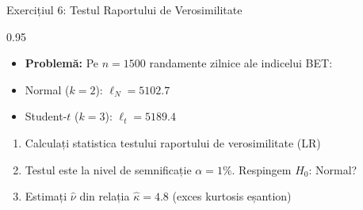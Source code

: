 \documentclass[9pt, aspectratio=169, t]{beamer}
\begin{document}
\begin{frame}{Exercițiul 6: Testul Raportului de Verosimilitate}
\begin{cminipage}{0.95\textwidth}
    \begin{itemize}\setlength{\itemsep}{0pt}
        \item \textbf{Problemă:} Pe $n = 1500$ randamente zilnice ale indicelui BET:
    \end{itemize}
    \begin{itemize}\setlength{\itemsep}{0pt}
        \item Normal ($k=2$): $\ell_N = 5102.7$
        \item Student-$t$ ($k=3$): $\ell_t = 5189.4$
    \end{itemize}
    \begin{enumerate}\setlength{\itemsep}{0pt}
        \item Calculați statistica testului raportului de verosimilitate (LR)
        \item Testul este la nivel de semnificație $\alpha = 1\%$. Respingem $H_0$: Normal?
        \item Estimați $\hat{\nu}$ din relația $\hat{\kappa} = 4.8$ (exces kurtosis eșantion)
    \end{enumerate}
\end{cminipage}
\end{frame}
\end{document}
